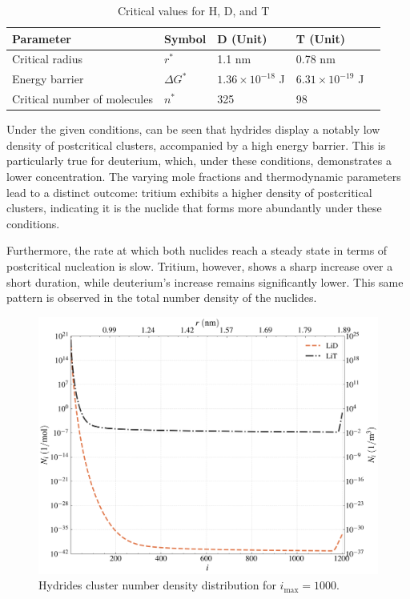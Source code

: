 \begin{table}[h]
	\centering
	\begin{tabular}{|l|l|l|l|l|}
	\hline
	\textbf{Parameter} & \textbf{Symbol} &\textbf{D (Unit)} & \textbf{T (Unit)} \\ \hline
	Critical radius        & $r^*$             & 1.1 nm              & 0.78 nm              \\ \hline
	Energy barrier         & $\Delta G^*$      &  $1.36 \times 10^{-18}$ J              & $6.31 \times 10^{-19}$ J              \\ \hline
	Critical number of molecules       & $n^*$          &  325                 & 98                 \\ \hline
	\end{tabular}
	\caption{Critical values for H, D, and T}
	\label{tab:critical_HDT}
\end{table}

Under the given conditions, can be seen that hydrides display a notably low density of postcritical clusters, accompanied by a high energy barrier. 
This is particularly true for deuterium, which, under these conditions, demonstrates a lower concentration. The varying mole fractions and 
thermodynamic parameters lead to a distinct outcome: tritium exhibits a higher density of postcritical clusters, indicating it is the nuclide 
that forms more abundantly under these conditions.

Furthermore, the rate at which both nuclides reach a steady state in terms of postcritical nucleation is slow. Tritium, however, 
shows a sharp increase over a short duration, while deuterium's increase remains significantly lower. This same pattern is observed 
in the total number density of the nuclides.
\begin{figure}[H]
    \centering
    \includegraphics[width=1.1\linewidth]{psd_hydrogen.png}
    \caption{Hydrides cluster number density distribution for $i_{\text{max}} = 1000$.}
    \label{fig:psd_cr}
\end{figure}


